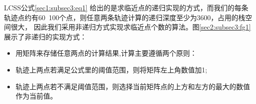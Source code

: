 \documentclass[UTF8]{ctexart}
\begin{document}
LCSS公式\ref{sec1:subsec3:eq1} 给出的是求临近点的递归实现的方式，而我们的每条轨迹点约有60~100个点，则任意两条轨迹计算的递归深度至少为3600，占用的栈空间很大，
因此我们采用非递归方式实现求临近点个数的算法。图\ref{sec2:subsec3:fg1}展示了非递归的实现方式：

\begin{itemize}
	\item 用矩阵来存储任意两点的计算结果,计算主要遵循两个原则：
	\item 轨迹上两点若满足公式里的阈值范围，则将矩阵左上角数值加1;
	\item 轨迹上两点若不满足阈值范围，则选择当前矩阵点的上方和左方的最大的数值作为当前值。
\end{itemize}
\end{document}
